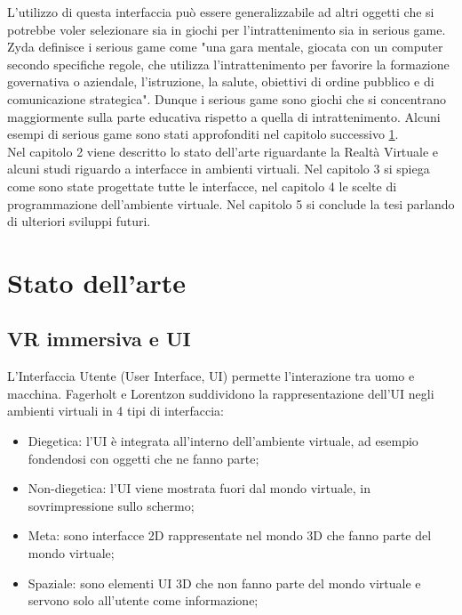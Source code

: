 \documentclass[target=bach,aauheader=]{thud}
\begin{document}
L'utilizzo di questa interfaccia può essere generalizzabile ad altri oggetti che si potrebbe voler selezionare sia in giochi per l'intrattenimento sia in serious game.
Zyda \cite{Zyda} definisce i serious game come "una gara mentale, giocata con un computer secondo specifiche regole, che utilizza l'intrattenimento per favorire la formazione governativa o aziendale, l'istruzione, la salute, obiettivi di ordine pubblico e di comunicazione strategica".
Dunque i serious game sono giochi che si concentrano maggiormente sulla parte educativa rispetto a quella di intrattenimento.
Alcuni esempi di serious game sono stati approfonditi nel capitolo successivo \ref{art}. \\

Nel capitolo 2 viene descritto lo stato dell'arte riguardante la Realtà Virtuale e alcuni studi riguardo a interfacce in ambienti virtuali.
Nel capitolo 3 si spiega come sono state progettate tutte le interfacce, nel capitolo 4 le scelte di programmazione dell'ambiente virtuale.
Nel capitolo 5 si conclude la tesi parlando di ulteriori sviluppi futuri.

\chapter{Stato dell'arte} %
\label{art}
\section{VR immersiva e UI}
L'Interfaccia Utente (User Interface, UI) permette l'interazione tra uomo e macchina.
Fagerholt e Lorentzon \cite{Fagerholt} suddividono la rappresentazione dell'UI negli ambienti virtuali in 4 tipi di interfaccia:
\begin{itemize}
    \item Diegetica: l'UI è integrata all'interno dell'ambiente virtuale, ad esempio fondendosi con oggetti che ne fanno parte;
    \item Non-diegetica: l'UI viene mostrata fuori dal mondo virtuale, in sovrimpressione sullo schermo;
    \item Meta: sono interfacce 2D rappresentate nel mondo 3D che fanno parte del mondo virtuale;
    \item Spaziale: sono elementi UI 3D che non fanno parte del mondo virtuale e servono solo all'utente come informazione;
\end{itemize} 
\end{document}
